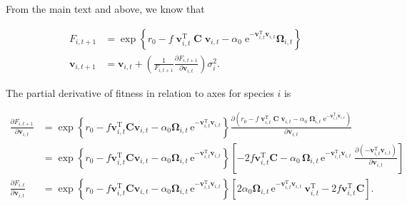From the main text and above, we know that

\begin{equation}\label{eq:main-text-info-axis-change}
\begin{split}
    F_{i,t+1} &= \exp \left\{
        r_0 - f \; \mathbf{v}_{i,t}^{\textrm{T}} \; \mathbf{C} \; \mathbf{v}_{i,t} -
        \alpha_0 \;\textrm{e}^{- \mathbf{v}_{i,t}^{\textrm{T}} \mathbf{v}_{i,t} } \mathbf{\Omega}_{i,t}
        \right\} \\
    \mathbf{v}_{i,t+1} &= \mathbf{v}_{i,t} + \left( \frac{1}{F_{i,t+1}}
        \frac{\partial F_{i,t+1}}{\partial \mathbf{v}_{i,t}} \right) \sigma^2_i
    \textrm{.}
\end{split}
\end{equation}


The partial derivative of fitness in relation to axes for species $i$ is


\begin{equation*}
\begin{split}
    \frac{\partial F_{i,t+1}}{\partial \mathbf{v}_{i,t}} &=
        \exp \left\{
            r_0
            - f \mathbf{v}_{i,t}^{\textrm{T}} \mathbf{C} \mathbf{v}_{i,t}
            - \alpha_0  \mathbf{\Omega}_{i,t} \,
                \textrm{e}^{- \mathbf{v}_{i,t}^{\textrm{T}} \mathbf{v}_{i,t}}
        \right\}
        \frac{\partial \!
            \left(
                r_0
                - f \; \mathbf{v}_{i,t}^{\textrm{T}} \; \mathbf{C} \; \mathbf{v}_{i,t}
                - \alpha_0 \; \mathbf{\Omega}_{i,t} \;
                    \textrm{e}^{- \mathbf{v}_{i,t}^{\textrm{T}} \mathbf{v}_{i,t}}
            \right)
            }{ \partial \mathbf{v}_{i,t} } \\
     &=
        \exp \left\{
            r_0
            - f \mathbf{v}_{i,t}^{\textrm{T}} \mathbf{C} \mathbf{v}_{i,t}
            - \alpha_0  \mathbf{\Omega}_{i,t} \,
                \textrm{e}^{- \mathbf{v}_{i,t}^{\textrm{T}} \mathbf{v}_{i,t}}
        \right\}
        \left[
            - 2 f \mathbf{v}_{i,t}^{\textrm{T}} \mathbf{C}
            - \alpha_0 \, \mathbf{\Omega}_{i,t} \,
                \textrm{e}^{- \mathbf{v}_{i,t}^{\textrm{T}} \mathbf{v}_{i,t} } \:
                \frac{\partial \! \left( - \mathbf{v}_{i,t}^{\textrm{T}} \mathbf{v}_{i,t} \right)
                    }{ \partial \mathbf{v}_{i,t} }
        \right] \\[2ex]
    \frac{ \partial F_{i,t} }{ \partial \mathbf{v}_{i,t} } &=
        \exp \left\{
            r_0
            - f \mathbf{v}_{i,t}^{\textrm{T}} \mathbf{C} \mathbf{v}_{i,t}
            - \alpha_0  \mathbf{\Omega}_{i,t} \,
                \textrm{e}^{- \mathbf{v}_{i,t}^{\textrm{T}} \mathbf{v}_{i,t}}
        \right\}
        \left[
            2 \alpha_0 \mathbf{\Omega}_{i,t} \,
                \textrm{e}^{- \mathbf{v}_{i,t}^{\textrm{T}} \mathbf{v}_{i,t}} \:
                \mathbf{v}_{i,t}^{\textrm{T}}
            - 2 f \mathbf{v}_{i,t}^{\textrm{T}} \mathbf{C}
        \right]
    \textrm{.}
\end{split}
\end{equation*}



